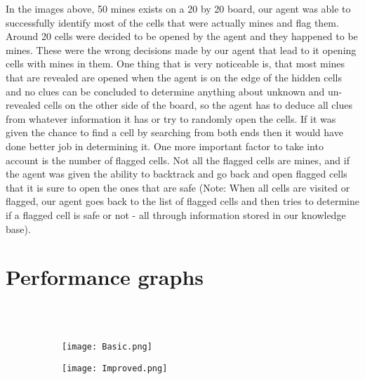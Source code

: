 \documentclass{article}
\begin{document}
\newpage
 In the images above, 50 mines exists on a 20 by 20 board, our agent was able to successfully identify most of the cells that were actually mines and flag them. Around 20 cells were decided to be opened by the agent and they happened to be mines. These were the wrong decisions made by our agent that lead to it opening cells with mines in them. One thing that is very noticeable is, that most mines that are revealed are opened when the agent is on the edge of the hidden cells and no clues can be concluded to determine anything about unknown and un-revealed cells on the  other side of the board, so the agent has to deduce all clues from whatever information it has or try to randomly open the cells. If it was given the chance to find a cell by searching from both ends then it would have done better job in determining it. One more important factor to take into account is the number of flagged cells. Not all the flagged cells are mines, and if the agent was given the ability to backtrack and go back and open flagged cells that it is sure to open the ones that are safe (Note: When all cells are visited or flagged, our agent goes back to the list of flagged cells and then tries to determine if a flagged cell is safe or not - all through information stored in our knowledge base).

\newpage
\section{Performance graphs}
\\\\


\begin{figure}[htp]
   \centering
  \begin{subfigure}[b]{0.7\textwidth}
    \texttt{[image: Basic.png]}
  \end{subfigure}
  \begin{subfigure}[b]{0.7\textwidth}
    \texttt{[image: Improved.png]}

  \end{subfigure}
\end{figure}
\end{document}
